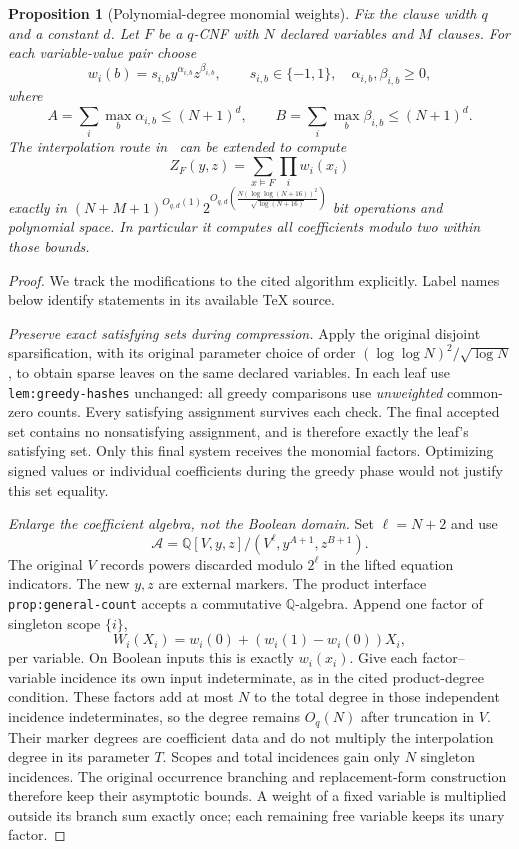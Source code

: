 \documentclass[11pt]{article}
\newtheorem{proposition}[theorem]{Proposition}
\theoremstyle{remark}\newtheorem{remark}[theorem]{Remark}
\newcommand{\rhoN}[1]{\frac{#1(\log\log(#1+16))^2}{\sqrt{\log(#1+16)}}}
\begin{document}
\begin{proposition}[Polynomial-degree monomial weights]\label{prop:weighted}
Fix the clause width $q$ and a constant $d$. Let $F$ be a $q$-CNF with
$N$ declared variables and $M$ clauses. For each variable-value pair choose
\[
 w_i(b)=s_{i,b}y^{\alpha_{i,b}}z^{\beta_{i,b}},\qquad
 s_{i,b}\in\{-1,1\},\quad\alpha_{i,b},\beta_{i,b}\ge0,
\]
where
\[
 A=\sum_i\max_b\alpha_{i,b}\le(N+1)^d,\qquad
 B=\sum_i\max_b\beta_{i,b}\le(N+1)^d.
\]
The interpolation route in~\cite{oai} can be extended to compute
\[
 Z_F(y,z)=\sum_{x\models F}\prod_iw_i(x_i)
\]
exactly in $(N+M+1)^{O_{q,d}(1)}2^{O_{q,d}(\rhoN{N})}$ bit
operations and polynomial space. In particular it computes all
coefficients modulo two within those bounds.
\end{proposition}

\begin{proof}
We track the modifications to the cited algorithm explicitly. Label names
below identify statements in its available TeX source.

\emph{Preserve exact satisfying sets during compression.}
Apply the original disjoint sparsification, with its original parameter
choice of order $(\log\log N)^2/\sqrt{\log N}$, to obtain sparse leaves
on the same declared variables. In each leaf use
\texttt{lem:greedy-hashes} unchanged: all greedy comparisons use
\emph{unweighted} common-zero counts. Every satisfying assignment survives
each check. The final accepted set contains no nonsatisfying assignment,
and is therefore exactly the leaf's satisfying set. Only this final
system receives the monomial factors. Optimizing signed values or
individual coefficients during the greedy phase would not justify this
set equality.

\emph{Enlarge the coefficient algebra, not the Boolean domain.}
Set $\ell=N+2$ and use
\[
 \mathcal A=\mathbb Q[V,y,z]/(V^\ell,y^{A+1},z^{B+1}).
\]
The original $V$ records powers discarded modulo $2^\ell$ in the lifted
equation indicators. The new $y,z$ are external markers. The product
interface \texttt{prop:general-count} accepts a commutative
$\mathbb Q$-algebra. Append one factor of singleton scope $\{i\}$,
\[
 W_i(X_i)=w_i(0)+(w_i(1)-w_i(0))X_i,
\]
per variable. On Boolean inputs this is exactly $w_i(x_i)$.
Give each factor--variable incidence its own input indeterminate, as in
the cited product-degree condition. These factors add at most $N$ to
the total degree in those independent incidence indeterminates, so the
degree remains $O_q(N)$ after truncation in $V$.
Their marker degrees are coefficient data and do not multiply the
interpolation degree in its parameter $T$. Scopes and total incidences
gain only $N$ singleton incidences. The original occurrence branching
and replacement-form construction therefore keep their asymptotic
bounds. A weight of a fixed variable is multiplied outside its branch
sum exactly once; each remaining free variable keeps its unary factor.


\end{proof}
\end{document}
